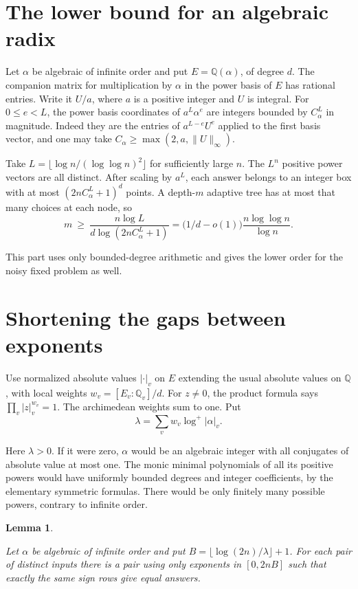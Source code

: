 \documentclass[11pt,letterpaper]{article}
\newtheorem{lemma}[theorem]{Lemma}
\numberwithin{equation}{section}
\begin{document}
\section{The lower bound for an algebraic radix}\label{sec:lower}

Let $\alpha$ be algebraic of infinite order and put $E=\mathbb Q(\alpha)$, of degree $d$. The
companion matrix for multiplication by $\alpha$ in the power basis of $E$ has rational
entries. Write it $U/a$, where $a$ is a positive integer and $U$ is integral. For $0\le e<L$,
the power basis coordinates of $a^L\alpha^e$ are integers bounded by $C_\alpha^L$ in
magnitude. Indeed they are the entries of $a^{L-e}U^e$ applied to the first basis vector, and
one may take $C_\alpha\ge\max(2,a,\|U\|_\infty)$.

Take $L=\lfloor\log n/(\log\log n)^2\rfloor$ for sufficiently large $n$. The $L^n$ positive
power vectors are all distinct. After scaling by $a^L$, each answer belongs to an integer box
with at most $(2nC_\alpha^L+1)^d$ points. A depth-$m$ adaptive tree has at most that many
choices at each node, so
\[
m\ \ge\ \frac{n\log L}{d\log(2nC_\alpha^L+1)}
=\bigl(1/d-o(1)\bigr)\frac{n\log\log n}{\log n}.
\]

This part uses only bounded-degree arithmetic and gives the lower order for the noisy fixed problem as well.

\section{Shortening the gaps between exponents}\label{sec:gaps}

Use normalized absolute values $|\cdot|_v$ on $E$ extending the usual absolute values on
$\mathbb Q$, with local weights $w_v=[E_v:\mathbb Q_v]/d$. For $z\ne0$, the product formula
says $\prod_v |z|_v^{w_v}=1$. The archimedean weights sum to one. Put
\[
\lambda=\sum_v w_v\log^+|\alpha|_v .
\]

Here $\lambda>0$. If it were zero, $\alpha$ would be an algebraic integer with all conjugates
of absolute value at most one. The monic minimal polynomials of all its positive powers would
have uniformly bounded degrees and integer coefficients, by the elementary symmetric formulas.
There would be only finitely many possible powers, contrary to infinite order.

\begin{lemma}\label{lem:gap}

Let $\alpha$ be algebraic of infinite order and put $B=\lfloor\log(2n)/\lambda\rfloor+1$. For
each pair of distinct inputs there is a pair using only exponents in $[0,2nB]$ such that
exactly the same sign rows give equal answers.
\end{lemma}
\end{document}
